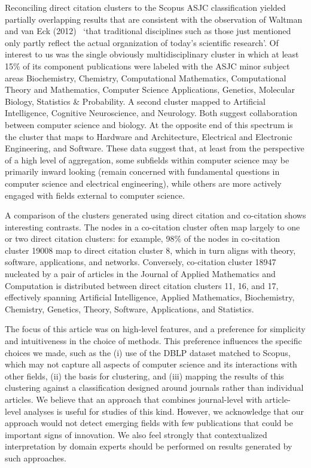 Reconciling direct citation clusters to the Scopus ASJC classification yielded partially overlapping results that are consistent with the observation of Waltman and van Eck (2012)~\cite{waltman_new_2012} `that traditional disciplines such as those just mentioned only partly reflect the actual organization of today’s scientific research'. Of interest to us was the single obviously multidisciplinary cluster in which at least 15\% of its component publications were labeled with the ASJC minor subject areas Biochemistry, Chemistry, Computational Mathematics, Computational Theory and Mathematics, Computer Science Applications, Genetics, Molecular Biology, Statistics \& Probability. A second cluster mapped to Artificial Intelligence, Cognitive Neuroscience, and Neurology.  Both suggest collaboration between computer science and biology. At the opposite end of this spectrum is the cluster that maps to Hardware and Architecture, Electrical and Electronic Engineering, and Software. These data suggest that, at least from the perspective of a high level of aggregation, some subfields within computer science may be primarily inward looking (remain concerned with fundamental questions in computer science and electrical engineering), while others are more actively engaged with fields external to computer science.

A comparison of the clusters generated using direct citation and co-citation shows interesting contrasts. The nodes in a co-citation cluster often map largely to one or two direct citation clusters: for example, 98\% of the nodes in co-citation cluster 19008 map to direct citation cluster 8, which in turn aligns with theory, software, applications, and networks. Conversely, co-citation cluster 18947 nucleated by a pair of articles in the Journal of Applied Mathematics and Computation is distributed between direct citation clusters 11, 16, and 17, effectively spanning Artificial Intelligence, Applied Mathematics, Biochemistry, Chemistry, Genetics, Theory, Software, Applications, and Statistics. 

The focus of this article was on high-level features, and a preference for simplicity and intuitiveness in the choice of methods. This preference influences the specific choices we made, such as the (i) use of the DBLP dataset matched to Scopus, which may not capture all aspects of computer science and its interactions with other fields, (ii) the basis for clustering, and (iii) mapping the results of this clustering against a classification designed around journals rather than individual articles. We believe that an approach that combines journal-level  with article-level analyses is useful for studies of this kind. However, we acknowledge that our approach would not detect emerging fields with few publications that could be important signs of innovation. We also feel strongly that contextualized interpretation by domain experts should be performed on results generated by such approaches.


